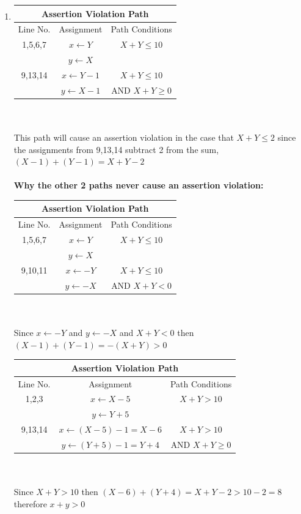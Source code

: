 \documentclass[a4paper,12pt]{article}
\begin{document}
\begin{enumerate}
\begin{enumerate}
				\item 	\begin{tabular}{|c|c|c|}
					\hline
					\multicolumn{3}{|c|}{Assertion Violation Path} \\
					\hline
					Line No. & Assignment & Path Conditions \\
					\hline
					1,5,6,7   & $x\leftarrow Y$ & $X+Y \le
					 10$ \\
					~ & $y\leftarrow X$ & ~   \\
					\hline
					9,13,14  & $x\leftarrow Y-1$ & $X+Y \le 10$ \\
					~ & $y\leftarrow X-1$ & AND $ X + Y \ge 0$   \\
					\hline
				\end{tabular} ~\\\\
			This path will cause an assertion violation in the case that $X+Y \le 2$ since the assignments from 9,13,14 subtract 2 from the sum, $(X-1) + (Y-1) = X + Y - 2$\\\\
			
			\textbf{Why the other 2 paths never cause an assertion violation:}\\
			\begin{tabular}{|c|c|c|}
				\hline
				\multicolumn{3}{|c|}{Assertion Violation Path} \\
				\hline
				Line No. & Assignment & Path Conditions \\
				\hline
				1,5,6,7   & $x\leftarrow Y$ & $X+Y \le
				10$ \\
				~ & $y\leftarrow X$ & ~   \\
				\hline
				9,10,11  & $x\leftarrow -Y$ & $X+Y \le 10$ \\
				~ & $y\leftarrow -X$ & AND $ X + Y < 0$   \\
				\hline
			\end{tabular} ~\\\\
			Since  $x\leftarrow -Y$ and $y\leftarrow -X$ and $X+Y<0$ then $(X-1) + (Y-1) = -(X+Y) > 0$
		
			\begin{tabular}{|c|c|c|}
				\hline
				\multicolumn{3}{|c|}{Assertion Violation Path} \\
				\hline
				Line No. & Assignment & Path Conditions \\
				\hline
				1,2,3   & $x\leftarrow X-5$ & $X+Y >
				10$ \\
				~ & $y\leftarrow Y+5$ & ~   \\
				\hline
				9,13,14  & $x\leftarrow (X-5)-1=X-6$ & $X+Y > 10$ \\
				~ & $y\leftarrow (Y+5)-1=Y+4$ & AND $ X + Y \ge 0$   \\
				\hline
			\end{tabular} ~\\\\
			Since $X+Y>10$ then $(X-6) + (Y+4) = X+Y-2 > 10-2 = 8$ therefore $x+y > 0$\\\\
		

\end{enumerate}
\end{enumerate}
\end{document}
